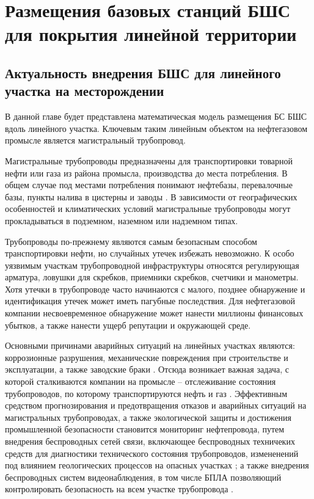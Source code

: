 \chapter{Размещения базовых станций БШС для покрытия линейной территории}\label{chapter_linear_network}
\section{Актуальность внедрения БШС для линейного участка на месторождении}

В данной главе будет представлена математическая модель размещения БС БШС вдоль линейного участка. Ключевым таким линейным объектом на нефтегазовом промысле является магистральный трубопровод. 

Магистральные трубопроводы предназначены для транспортировки товарной нефти или газа из района промысла, производства до места потребления. В общем случае под местами потребления понимают нефтебазы, перевалочные базы, пункты налива в цистерны и заводы \cite{Deineko2018}. В зависимости от географических особенностей и климатических условий магистральные трубопроводы могут прокладываться в подземном, наземном или надземном типах.

Трубопроводы по-прежнему являются самым безопасным способом транспортировки нефти, но случайных утечек избежать невозможно.  К особо уязвимым участкам трубопроводной инфраструктуры относятся регулирующая арматура, ловушки для скребков, приемники скребков, счетчики и манометры.
Хотя утечки в трубопроводе часто начинаются с малого, позднее обнаружение и идентификация утечек может иметь пагубные последствия. Для нефтегазовой компании несвоевременное обнаружение может нанести миллионы финансовых убытков, а также нанести ущерб репутации и окружающей среде.

Основными причинами аварийных ситуаций на линейных участках являются: коррозионные разрушения, механические повреждения при строительстве и эксплуатации, а также заводские браки \cite{Deineko2018_alone}. Отсюда возникает важная задача, с которой сталкиваются компании на промысле -- отслеживание состояния трубопроводов, по которому транспортируются нефть и газ \cite{Aalsalem2018}. Эффективным средством прогнозирования и предотвращения отказов и аварийных ситуаций на магистральных трубопроводах, а также экологической защиты и достижения промышленной безопасности становится мониторинг нефтепровода, путем внедрения беспроводных сетей связи, включающее беспроводных техничеких средств для диагностики технического состояния трубопроводов, измененений под влиянием геологических процессов на опасных участках \cite{Krzyszton2021,Mehmood2016, Lin2019, Adegboye2019}; а также внедрения беспроводных систем видеонаблюдения, в том числе БПЛА позволяющий контролировать безопасность на всем участке трубопровода \cite{Fedorova2020, Aljuaid2020, Adegboye2019, Gomez2017, Fawzi2019}.


